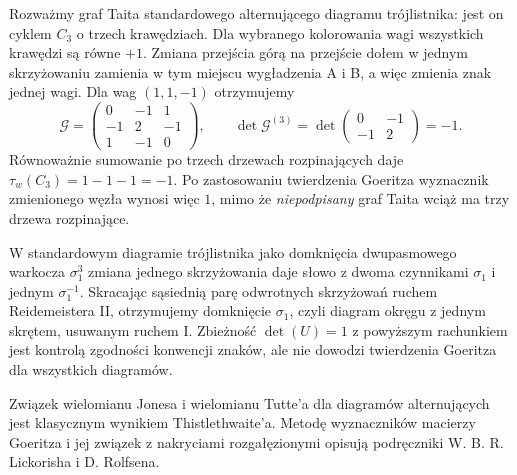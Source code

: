 \begin{przyklad}
\label{ex:tg-goeritz-crossing-change}
Rozważmy graf Taita standardowego
alternującego diagramu trójlistnika:
jest on cyklem $C_3$ o trzech krawędziach.
Dla wybranego kolorowania wagi
wszystkich krawędzi są równe $+1$.
Zmiana przejścia górą na przejście dołem
w jednym skrzyżowaniu zamienia w tym
miejscu wygładzenia A i B, a więc
zmienia znak jednej wagi.
Dla wag $(1,1,-1)$ otrzymujemy
\[
\mathcal G=
\begin{pmatrix}
0&-1&1\\
-1&2&-1\\
1&-1&0
\end{pmatrix},
\qquad
\det\mathcal G^{(3)}
=\det\begin{pmatrix}0&-1\\-1&2\end{pmatrix}
=-1.
\]
Równoważnie sumowanie po trzech drzewach
rozpinających daje
$\tau_w(C_3)=1-1-1=-1$.
Po zastosowaniu twierdzenia Goeritza
wyznacznik zmienionego węzła wynosi więc $1$,
mimo że \emph{niepodpisany} graf Taita
wciąż ma trzy drzewa rozpinające.

W standardowym diagramie trójlistnika jako domknięcia
dwupasmowego warkocza $\sigma_1^3$ zmiana jednego
skrzyżowania daje słowo z dwoma czynnikami $\sigma_1$
i jednym $\sigma_1^{-1}$. Skracając sąsiednią parę
odwrotnych skrzyżowań ruchem Reidemeistera II,
otrzymujemy domknięcie $\sigma_1$, czyli diagram
okręgu z jednym skrętem, usuwanym ruchem I. Zbieżność
$\det(U)=1$ z powyższym rachunkiem
jest kontrolą zgodności konwencji znaków,
ale nie dowodzi twierdzenia Goeritza
dla wszystkich diagramów.
\end{przyklad}

\begin{uwaga}[Literatura]
Związek wielomianu Jonesa i wielomianu Tutte'a dla diagramów
alternujących jest klasycznym wynikiem Thistlethwaite'a.
Metodę wyznaczników macierzy Goeritza i jej związek z
nakryciami rozgałęzionymi opisują podręczniki
W. B. R. Lickorisha i D. Rolfsena.
\end{uwaga}


